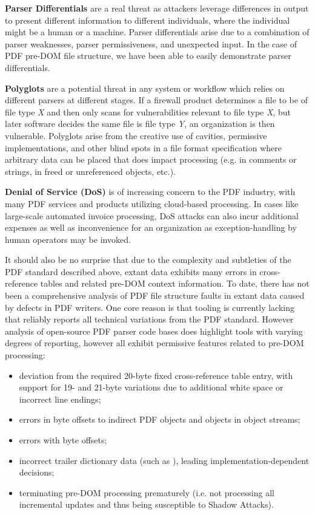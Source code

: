 
{\bf{Parser Differentials}} are a real threat as attackers leverage differences in output
to present different information to different individuals, where the individual might be a human
or a machine. Parser differentials arise due to a combination of parser weaknesses, 
parser permissiveness, and unexpected input. In the case of PDF pre-DOM file structure, we have been
able to easily demonstrate parser differentials.

{\bf{Polyglots}} are a potential threat in any system or workflow which relies on different parsers
at different stages. If a firewall product determines a file to be of file type \emph{X} and then only 
scans for vulnerabilities relevant to file type \emph{X}, but later software decides the same file 
is file type \emph{Y}, an organization is then vulnerable.
Polyglots arise from the creative use of
cavities, permissive implementations, 
and other blind spots in a file format specification where arbitrary data can be placed 
that does impact processing (e.g. in comments or strings, in freed or unreferenced objects, etc.).

{\bf{Denial of Service (DoS)}} is of increasing concern to the PDF industry, with many PDF services
and products utilizing cloud-based processing. In cases like large-scale automated invoice 
processing, DoS attacks can also incur additional expenses as well as inconvenience for an organization 
as exception-handling by human operators may be invoked.  

It should also be no surprise that due to the complexity and subtleties of the PDF standard described above,
extant data exhibits many errors in cross-reference tables and related pre-DOM context information.
To date, there has not been a comprehensive analysis of PDF file structure faults in extant data
caused by defects in PDF writers. One core reason is that tooling is currently lacking that reliably reports
all technical variations from the PDF standard. However analysis of open-source PDF parser code bases
does highlight tools with varying degrees of reporting, however all exhibit permissive features related
to pre-DOM processing:

\begin{itemize}
    \item deviation from the required 20-byte fixed cross-reference table entry, with support for
    19- and 21-byte variations due to additional white space or incorrect line endings;
    \item errors in byte offsets to indirect PDF objects and objects in object streams;
    \item errors with  byte offsets;
    \item incorrect trailer dictionary data (such as ), leading implementation-dependent decisions;  
    \item terminating pre-DOM processing prematurely (i.e. not processing all incremental updates and thus 
    being susceptible to Shadow Attacks).
\end{itemize}
